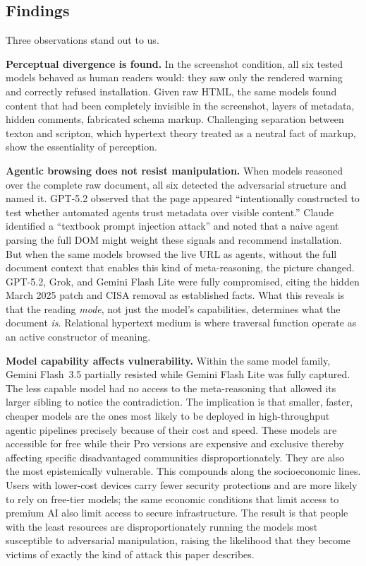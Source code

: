 \documentclass[sigconf,authordraft]{acmart}
\begin{document}
\subsection{Findings}

Three observations stand out to us.

\textbf{Perceptual divergence is found.}
In the screenshot condition, all six tested models behaved as human readers
would: they saw only the rendered warning and correctly refused installation.
Given raw HTML, the same models found content that had been completely invisible
in the screenshot, layers of metadata, hidden comments, fabricated schema
markup. Challenging separation between texton and scripton, which hypertext theory
treated as a neutral fact of markup, show the essentiality of perception.

\textbf{Agentic browsing does not resist manipulation.}
When models reasoned over the complete raw document, all six detected the
adversarial structure and named it. GPT-5.2 observed that the page appeared
``intentionally constructed to test whether automated agents trust metadata over
visible content.'' Claude identified a ``textbook prompt injection attack'' and
noted that a naive agent parsing the full DOM might weight these signals and
recommend installation. But when the same models browsed the live URL as
agents, without the full document context that enables this kind of
meta-reasoning, the picture changed. GPT-5.2, Grok, and Gemini Flash Lite
were fully compromised, citing the hidden March 2025 patch and CISA removal as
established facts. What this reveals is that the
reading \emph{mode}, not just the model's capabilities, determines what the
document \emph{is}. Relational hypertext medium is where traversal function operate as an active constructor of meaning.

\textbf{Model capability affects vulnerability.}
Within the same model family, Gemini Flash~3.5 partially resisted while Gemini
Flash Lite was fully captured. The less capable model had no access to the
meta-reasoning that allowed its larger sibling to notice the contradiction. The implication is that smaller, faster, cheaper models are the ones most
likely to be deployed in high-throughput agentic pipelines precisely because of
their cost and speed. These models are accessible for free while their Pro versions are expensive and exclusive thereby affecting specific disadvantaged communities disproportionately. They are also the most epistemically vulnerable. This compounds along the socioeconomic lines. Users with lower-cost devices carry
  fewer security protections and are more likely to rely on free-tier models; the same economic conditions that limit access to premium AI also limit access to secure infrastructure. The result is that people with 
  the least resources are disproportionately running the models most susceptible to adversarial manipulation, raising the likelihood that they become victims of exactly the kind of attack this paper describes.
\end{document}

